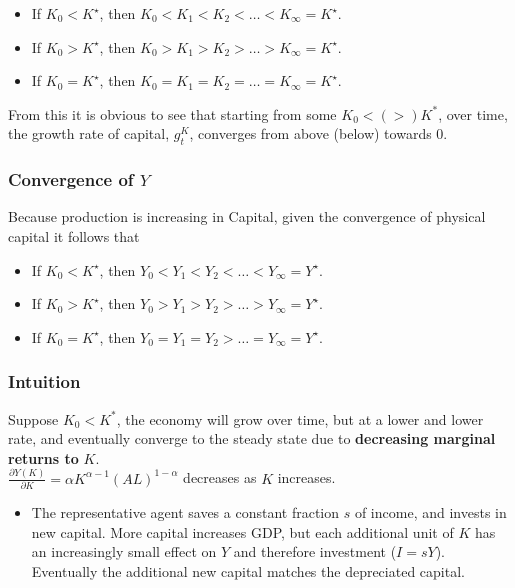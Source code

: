 \documentclass[11pt]{article}
\begin{document}
\begin{itemize}
    \item If $K_0<K^{\star}$, then $K_0<K_1<K_2<\ldots<K_{\infty}=K^{\star}$.
    \item If $K_0>K^{\star}$, then $K_0>K_1>K_2>\ldots>K_{\infty}=K^{\star}$.
    \item If $K_0=K^{\star}$, then $K_0=K_1=K_2=\ldots=K_{\infty}=K^{\star}$.
\end{itemize}

From this it is obvious to see that starting from some $K_0<(>)K^*$, over time, the growth rate of capital, $g_t^K$, converges from above (below) towards 0.

\subsubsection{Convergence of $Y$}

Because production is increasing in Capital, given the convergence of physical capital it follows that 

\begin{itemize}
    \item If $K_0<K^{\star}$, then $Y_0<Y_1<Y_2<\ldots<Y_{\infty}=Y^{\star}$.
    \item If $K_0>K^{\star}$, then $Y_0>Y_1>Y_2>\ldots>Y_{\infty}=Y^{\star}$.
    \item If $K_0=K^{\star}$, then $Y_0=Y_1=Y_2>\ldots=Y_{\infty}=Y^{\star}$.
\end{itemize}

\subsubsection{Intuition}
Suppose $K_0<K^*$, the economy will grow over time, but at a lower and lower rate, and eventually converge to the steady state due to \textbf{decreasing marginal returns to} $K$.\\

$\frac{\partial Y(K)}{\partial K} = \alpha K^{\alpha-1}(AL)^{1-\alpha}$ decreases as $K$ increases.

\begin{itemize}
    \item The representative agent saves a constant fraction $s$ of income, and invests in new capital. More capital increases GDP, but each additional unit of $K$ has an increasingly small effect on $Y$ and therefore investment ($I = sY$). Eventually the additional new capital matches the depreciated capital.
\end{itemize}
\end{document}
